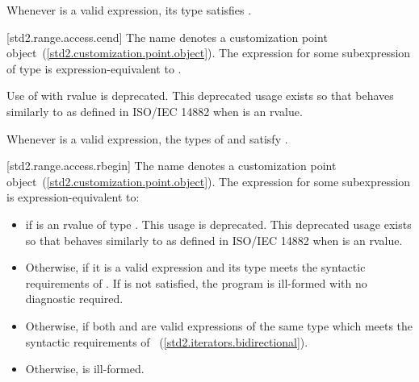 \pnum
\enternote Whenever  is a valid expression, its
type satisfies . \exitnote

[std2.range.access.cend]{}
\pnum
The name  denotes a customization point
object~(\ref{std2.customization.point.object}). The expression
 for some subexpression  of type 
is expression-equivalent to .

\pnum
Use of  with rvalue  is deprecated.
\enternote This deprecated usage exists so that 
behaves similarly to  as defined in ISO/IEC 14882 when
 is an rvalue. \exitnote

\pnum
\enternote Whenever  is a valid expression, the
types of  and  satisfy
. \exitnote

[std2.range.access.rbegin]{}
\pnum
The name  denotes a customization point
object~(\ref{std2.customization.point.object}). The expression
 for some subexpression  is expression-equivalent
to:

\begin{itemize}
\item
   if  is an rvalue of
  type . This usage is deprecated.
  \enternote This deprecated usage exists so that
   behaves similarly to 
  as defined in ISO/IEC 14882 when  is an rvalue. \exitnote

\item
  Otherwise,  if it is a valid expression and its type  meets the
  syntactic requirements of . If 
  is not satisfied, the program is ill-formed with no diagnostic
  required.

\item
  Otherwise,  if both
   and  are valid expressions of the same
  type  which meets the syntactic requirements of
  ~(\ref{std2.iterators.bidirectional}).

\item
  Otherwise,  is ill-formed.
\end{itemize}

